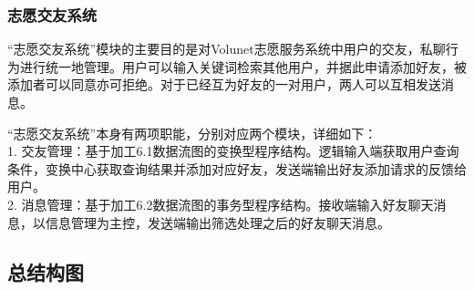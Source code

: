\subsubsection{志愿交友系统}

“志愿交友系统”模块的主要目的是对Volunet志愿服务系统中用户的交友，私聊行为进行统一地管理。用户可以输入关键词检索其他用户，并据此申请添加好友，被添加者可以同意亦可拒绝。对于已经互为好友的一对用户，两人可以互相发送消息。

“志愿交友系统”本身有两项职能，分别对应两个模块，详细如下：\\
1. 交友管理：基于加工6.1数据流图的变换型程序结构。逻辑输入端获取用户查询条件，变换中心获取查询结果并添加对应好友，发送端输出好友添加请求的反馈给用户。\\
2. 消息管理：基于加工6.2数据流图的事务型程序结构。接收端输入好友聊天消息，以信息管理为主控，发送端输出筛选处理之后的好友聊天消息。

\begin{landscape}
\begin{figure}[bp]
    \end{figure}
\end{landscape}

\subsection{总结构图}


